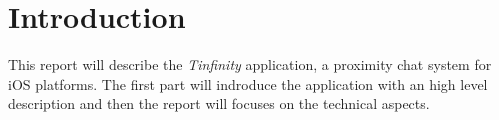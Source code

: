 \section{Introduction}
This report will describe the \emph{Tinfinity} application, a proximity chat system for iOS platforms. The first part will indroduce the application with an high level description and then the report will focuses on the technical aspects.